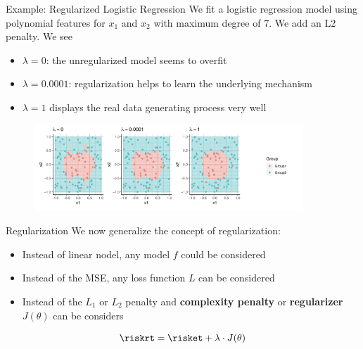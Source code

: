 \begin{frame}{Example: Regularized Logistic Regression}
We fit a logistic regression model using polynomial features for \(x_1\)
and \(x_2\) with maximum degree of \(7\). We add an L2 penalty. We
see
\begin{itemize}
\item \(\lambda = 0\): the unregularized model seems to overfit
\item \(\lambda = 0.0001\): regularization helps to learn the underlying mechanism
\item \(\lambda = 1\) displays the real data generating process very well
\end{itemize}
\begin{figure}
\includegraphics[width=0.9\textwidth]{plots/regularizedLogReg.png}
\end{figure}

\end{frame}


\begin{frame}{Regularization}
We now generalize the concept of regularization:
\begin{itemize}
\item Instead of linear nodel, any model \(f\) could be considered
\item Instead of the MSE, any loss function \(L\) can be considered
\item Instead of the \(L_1\) or \(L_2\) penalty and \textbf{complexity penalty} or
  \textbf{regularizer} \(J(\theta)\) can be considers 
\end{itemize}

\[
\riskrt = \risket + \lambda \cdot J(\theta)
\]

\end{frame}


